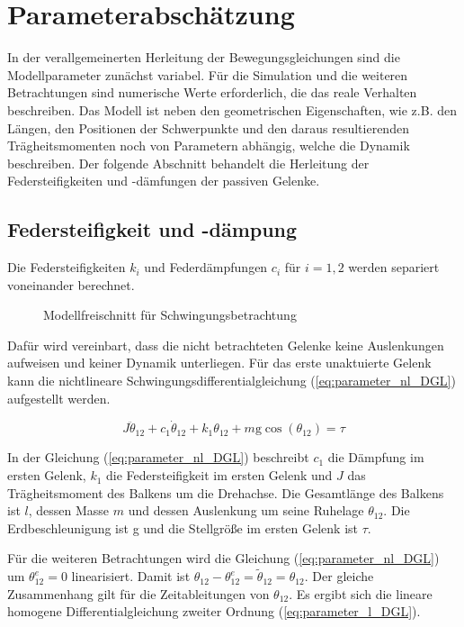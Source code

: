 \newpage
\chapter{Parameterabschätzung}

In der verallgemeinerten Herleitung der Bewegungsgleichungen sind die Modellparameter zunächst variabel. Für die Simulation und die weiteren Betrachtungen sind numerische Werte erforderlich, die das reale Verhalten beschreiben. Das Modell ist neben den geometrischen Eigenschaften, wie z.B. den Längen, den Positionen der Schwerpunkte und den daraus resultierenden Trägheitsmomenten noch von Parametern abhängig, welche die Dynamik beschreiben. Der folgende Abschnitt behandelt die Herleitung der Federsteifigkeiten und -dämfungen der passiven Gelenke.

\section{Federsteifigkeit und -dämpung}
\label{abs:Federparameter}
Die Federsteifigkeiten $k_i$ und Federdämpfungen $c_i$ für $i=1,2$ werden separiert voneinander berechnet. 

\begin{figure}[h]
	\centering
	
	\caption[Modellparameter]{Modellfreischnitt für Schwingungsbetrachtung}
	\label{fig:parameter_abschaetung}
\end{figure}

Dafür wird vereinbart, dass die nicht betrachteten Gelenke keine Auslenkungen aufweisen und keiner Dynamik unterliegen. 
Für das erste unaktuierte Gelenk kann die nichtlineare Schwingungsdifferentialgleichung (\ref{eq:parameter_nl_DGL}) aufgestellt werden. 

\begin{equation} \label{eq:parameter_nl_DGL}
J\ddot{\theta}_{12}+c_1\dot{\theta}_{12}+k_1\theta_{12}+m\mathrm{g}\cos(\theta_{12})=\tau
\end{equation}

In der Gleichung (\ref{eq:parameter_nl_DGL}) beschreibt $c_1$ die Dämpfung im ersten Gelenk, $k_1$ die Federsteifigkeit im ersten Gelenk und $J$ das Trägheitsmoment des Balkens um die Drehachse. Die Gesamtlänge des Balkens ist $l$, dessen Masse $m$ und dessen Auslenkung um seine Ruhelage $\theta_{12}$. Die Erdbeschleunigung ist g und die Stellgröße im ersten Gelenk ist $\tau$.

Für die weiteren Betrachtungen wird die Gleichung (\ref{eq:parameter_nl_DGL}) um $\theta_{12}^e=0$ linearisiert. Damit ist $\theta_{12}-\theta_{12}^e=\tilde{\theta}_{12}=\theta_{12}$. Der gleiche Zusammenhang gilt für die Zeitableitungen von $\theta_{12}$. Es ergibt sich die lineare homogene Differentialgleichung zweiter Ordnung (\ref{eq:parameter_l_DGL}).

